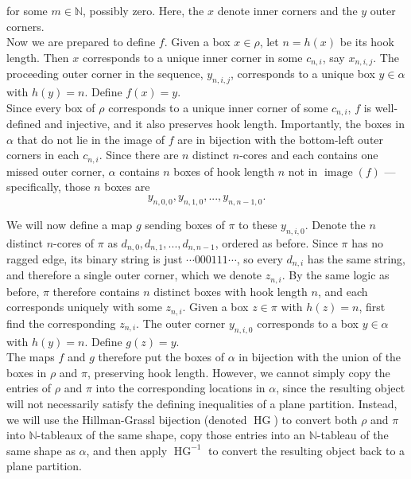 \begin{Proof}
	for some $m \in \mathbb{N}$, possibly zero. Here, the $x$ denote inner corners and the $y$ outer corners.\\
	
	Now we are prepared to define $f$. Given a box $x \in \rho$, let $n = h(x)$ be its hook length. Then $x$ corresponds to a unique inner corner in some $c_{n, i}$, say $x_{n, i, j}$. The proceeding outer corner in the sequence, $y_{n, i, j}$, corresponds to a unique box $y \in \alpha$ with $h(y) = n$. Define $f(x) = y$.\\
	
	Since every box of $\rho$ corresponds to a unique inner corner of some $c_{n, i}$, $f$ is well-defined and injective, and it also preserves hook length. Importantly, the boxes in $\alpha$ that do not lie in the image of $f$ are in bijection with the bottom-left outer corners in each $c_{n, i}$. Since there are $n$ distinct $n$-cores and each contains one missed outer corner, $\alpha$ contains $n$ boxes of hook length $n$ not in $\operatorname{image}(f)$ --- specifically, those $n$ boxes are
	$$
		y_{n, 0, 0}, y_{n, 1, 0}, ..., y_{n, n - 1, 0}.
	$$
	
	We will now define a map $g$ sending boxes of $\pi$ to these $y_{n, i, 0}$. Denote the $n$ distinct $n$-cores of $\pi$ as $d_{n, 0}, d_{n, 1}, ..., d_{n, n - 1}$, ordered as before. Since $\pi$ has no ragged edge, its binary string is just $\cdots 000111 \cdots$, so every $d_{n, i}$ has the same string, and therefore a single outer corner, which we denote $z_{n, i}$. By the same logic as before, $\pi$ therefore contains $n$ distinct boxes with hook length $n$, and each corresponds uniquely with some $z_{n, i}$. Given a box $z \in \pi$ with $h(z) = n$, first find the corresponding $z_{n, i}$. The outer corner $y_{n, i, 0}$ corresponds to a box $y \in \alpha$ with $h(y) = n$. Define $g(z) = y$.\\
	
	The maps $f$ and $g$ therefore put the boxes of $\alpha$ in bijection with the union of the boxes in $\rho$ and $\pi$, preserving hook length. However, we cannot simply copy the entries of $\rho$ and $\pi$ into the corresponding locations in $\alpha$, since the resulting object will not necessarily satisfy the defining inequalities of a plane partition. Instead, we will use the Hillman-Grassl bijection (denoted $\operatorname{HG}$) to convert both $\rho$ and $\pi$ into $\mathbb{N}$-tableaux of the same shape, copy those entries into an $\mathbb{N}$-tableau of the same shape as $\alpha$, and then apply $\operatorname{HG}^{-1}$ to convert the resulting object back to a plane partition.\\
	

\end{Proof}

